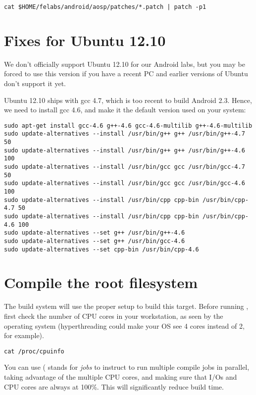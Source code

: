 \begin{verbatim}
cat $HOME/felabs/android/aosp/patches/*.patch | patch -p1
\end{verbatim}

\section{Fixes for Ubuntu 12.10}

We don't officially support Ubuntu 12.10 for our Android labs, but you
may be forced to use this version if you have a recent PC and earlier
versions of Ubuntu don't support it yet.

Ubuntu 12.10 ships with gcc 4.7, which is too recent to build Android
2.3. Hence, we need to install gcc 4.6, and make it the default version
used on your system:

\begin{verbatim}
sudo apt-get install gcc-4.6 g++-4.6 gcc-4.6-multilib g++-4.6-multilib
sudo update-alternatives --install /usr/bin/g++ g++ /usr/bin/g++-4.7 50
sudo update-alternatives --install /usr/bin/g++ g++ /usr/bin/g++-4.6 100
sudo update-alternatives --install /usr/bin/gcc gcc /usr/bin/gcc-4.7 50
sudo update-alternatives --install /usr/bin/gcc gcc /usr/bin/gcc-4.6 100
sudo update-alternatives --install /usr/bin/cpp cpp-bin /usr/bin/cpp-4.7 50
sudo update-alternatives --install /usr/bin/cpp cpp-bin /usr/bin/cpp-4.6 100
sudo update-alternatives --set g++ /usr/bin/g++-4.6
sudo update-alternatives --set g++ /usr/bin/gcc-4.6
sudo update-alternatives --set cpp-bin /usr/bin/cpp-4.6
\end{verbatim}

\section{Compile the root filesystem}

The build system will use the proper setup to build this
target. Before running , first check the number of CPU
cores in your workstation, as seen by the operating system
(hyperthreading could make your OS see 4 cores instead of 2, for
example).

\begin{verbatim}
cat /proc/cpuinfo
\end{verbatim}

You can use  ( stands for {\it jobs} to instruct
 to run multiple compile jobs in parallel, taking advantage
of the multiple CPU cores, and making sure that I/Os and CPU cores are
always at 100\%. This will significantly reduce build time.

